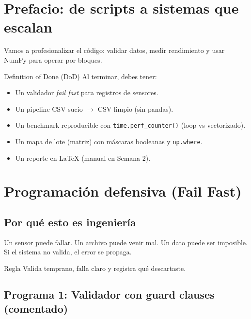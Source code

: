 \documentclass[11pt, a4paper]{article}
\begin{document}
\section*{Prefacio: de scripts a sistemas que escalan}
Vamos a profesionalizar el código: validar datos, medir rendimiento y usar NumPy para operar por bloques.

\begin{conceptbox}{Definition of Done (DoD)}
Al terminar, debes tener:
\begin{itemize}
\item Un validador \textit{fail fast} para registros de sensores.
\item Un pipeline CSV sucio \(\rightarrow\) CSV limpio (sin pandas).
\item Un benchmark reproducible con \texttt{time.perf\_counter()} (loop vs vectorizado).
\item Un mapa de lote (matriz) con máscaras booleanas y \texttt{np.where}.
\item Un reporte en \LaTeX{} (manual en Semana 2).
\end{itemize}
\end{conceptbox}

\newpage

\section{Programación defensiva (Fail Fast)}

\subsection{Por qué esto es ingeniería}
Un sensor puede fallar. Un archivo puede venir mal. Un dato puede ser imposible.
Si el sistema no valida, el error se propaga.

\begin{conceptbox}{Regla}
Valida temprano, falla claro y registra qué descartaste.
\end{conceptbox}

\subsection{Programa 1: Validador con guard clauses (comentado)}
\end{document}
